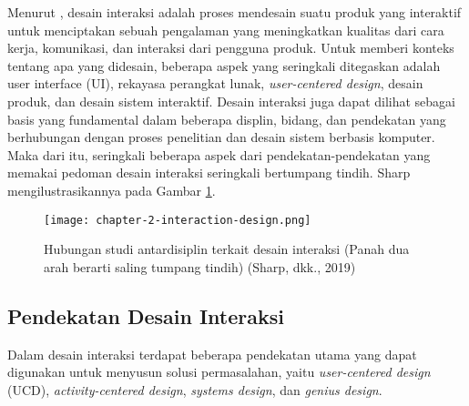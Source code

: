 
Menurut \textcite{sharp2019interaction}, desain interaksi adalah proses mendesain suatu produk yang interaktif untuk menciptakan sebuah pengalaman yang meningkatkan kualitas dari cara kerja, komunikasi, dan interaksi dari pengguna produk. Untuk memberi konteks tentang apa yang didesain, beberapa aspek yang seringkali ditegaskan adalah user interface (UI), rekayasa perangkat lunak, \textit{user-centered design}, desain produk, dan desain sistem interaktif. Desain interaksi juga dapat dilihat sebagai basis yang fundamental dalam beberapa displin, bidang, dan pendekatan yang berhubungan dengan proses penelitian dan desain sistem berbasis komputer. Maka dari itu, seringkali beberapa aspek dari pendekatan-pendekatan yang memakai pedoman desain interaksi seringkali bertumpang tindih. Sharp mengilustrasikannya pada Gambar \ref{fig:desain_interaksi}.


\begin{figure}[h]
  \centering
  \texttt{[image: chapter-2-interaction-design.png]}
  \caption{Hubungan studi antardisiplin terkait desain interaksi (Panah dua arah berarti saling tumpang tindih) (Sharp, dkk., 2019)}
  \label{fig:desain_interaksi}
\end{figure}

\subsection{Pendekatan Desain Interaksi}
\label{subsec:pendekatan_id}

Dalam desain interaksi terdapat beberapa pendekatan utama yang dapat digunakan untuk menyusun solusi permasalahan, yaitu \textit{user-centered design} (UCD), \textit{activity-centered design}, \textit{systems design}, dan \textit{genius design}. \parencite{saffer2010designing}

